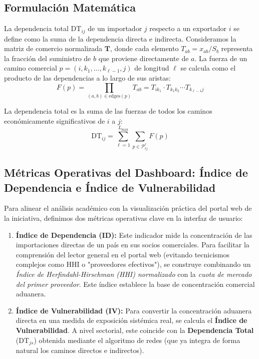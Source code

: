 \documentclass[final,1p,times,authoryear]{elsarticle}
\begin{document}
\subsection{Formulación Matemática}
La dependencia total $\text{DT}_{ij}$ de un importador $j$ respecto a un exportador $i$ se define como la suma de la dependencia directa e indirecta.
Consideramos la matriz de comercio normalizada $\mathbf{T}$, donde cada elemento $T_{ab} = x_{ab} / S_b$ representa la fracción del suministro de $b$ que proviene directamente de $a$.
La fuerza de un camino comercial $p = (i, k_1, \ldots, k_{\ell-1}, j)$ de longitud $\ell$ se calcula como el producto de las dependencias a lo largo de sus aristas:
\begin{equation}
F(p) = \prod_{(a,b) \in \text{edges}(p)} T_{ab} = T_{ik_1} \cdot T_{k_1k_2} \cdots T_{k_{\ell-1}j}
\end{equation}

La dependencia total es la suma de las fuerzas de todos los caminos económicamente significativos de $i$ a $j$:
\begin{equation}
\text{DT}_{ij} = \sum_{\ell=1}^{L_{\max}} \sum_{p \in \mathcal{P}_{ij}^{\ell}} F(p)
\end{equation}

\subsection{Métricas Operativas del Dashboard: Índice de Dependencia e Índice de Vulnerabilidad}

Para alinear el análisis académico con la visualización práctica del portal web de la iniciativa, definimos dos métricas operativas clave en la interfaz de usuario:

\begin{enumerate}
    \item \textbf{Índice de Dependencia (ID):} Este indicador mide la concentración de las importaciones directas de un país en sus socios comerciales. Para facilitar la comprensión del lector general en el portal web (evitando tecnicismos complejos como HHI o "proveedores efectivos"), se construye combinando un \textit{Índice de Herfindahl-Hirschman (HHI) normalizado} con la \textit{cuota de mercado del primer proveedor}. Este índice establece la base de concentración comercial aduanera.
    
    \item \textbf{Índice de Vulnerabilidad (IV):} Para convertir la concentración aduanera directa en una medida de exposición sistémica real, se calcula el \textbf{Índice de Vulnerabilidad}. A nivel sectorial, este coincide con la \textbf{Dependencia Total} ($\text{DT}_{js}$) obtenida mediante el algoritmo de redes (que ya integra de forma natural los caminos directos e indirectos). 
\end{enumerate}
\end{document}

